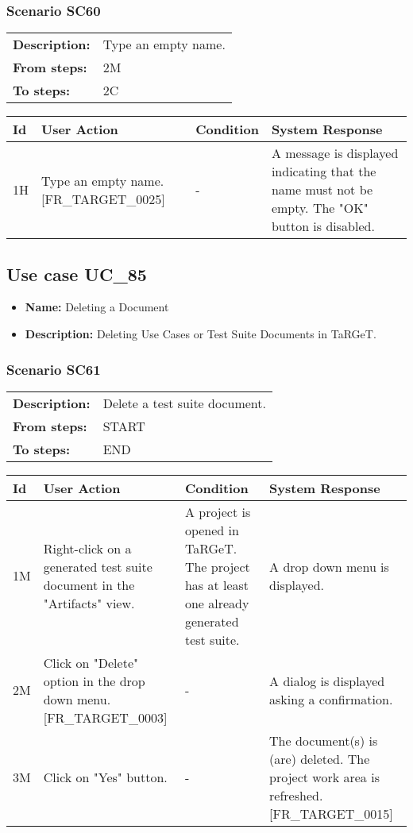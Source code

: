 \documentclass[a4paper,11pt]{article}
\newcommand{\bl}{\\ \hline}
\begin{document}
\subsubsection*{Scenario SC60}
\begin{tabular}{p{1in}p{4in}}
{\bf Description:} & Type an empty name. \\
{\bf From steps:} & 2M \\
{\bf To steps:} & 2C \\
\end{tabular}
 
\begin{tabular}{|p{0.8in}|p{1.6in}|p{1.6in}|p{1.6in}|}
\hline
Id & User Action & Condition & System Response  \bl 
1H & Type an empty name. [FR_TARGET_0025] & - & A message is displayed indicating that the name must not
						be empty. The "OK" button is disabled. \bl 
\end{tabular}
\subsection*{Use case UC_85}
\begin{itemize}
\item {\bf Name: }Deleting a Document
\item {\bf Description: }Deleting Use Cases or Test Suite Documents in TaRGeT.
			
\end{itemize}
\subsubsection*{Scenario SC61}
\begin{tabular}{p{1in}p{4in}}
{\bf Description:} & Delete a test suite document. \\
{\bf From steps:} & START \\
{\bf To steps:} & END \\
\end{tabular}
 
\begin{tabular}{|p{0.8in}|p{1.6in}|p{1.6in}|p{1.6in}|}
\hline
Id & User Action & Condition & System Response  \bl 
1M & Right-click on a generated test suite document in the
						"Artifacts" view.  & A project is opened in TaRGeT. The project has at least
						one already generated test suite. & A drop down menu is displayed. \bl 
2M & Click on "Delete" option in the drop down menu.
						[FR_TARGET_0003] & - & A dialog is displayed asking a confirmation. \bl 
3M & Click on "Yes" button. & - & The document(s) is (are) deleted. The project work area
						is refreshed. [FR_TARGET_0015] \bl 
\end{tabular}
\end{document}
